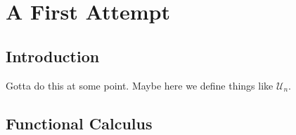 \chapter{A First Attempt}\label{ch:FirstAttempt}


\section{Introduction}%
\label{sec:Intro}

Gotta do this at some point. Maybe here we define things like \(\mathcal{U}_n\).

\section{Functional Calculus}%
\label{sec:functionalcalc}

